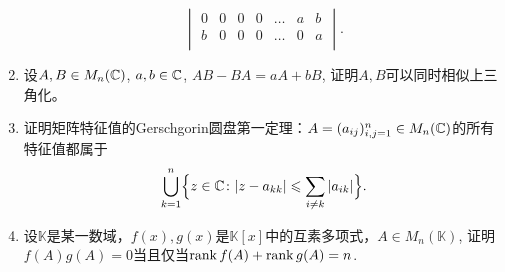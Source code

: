\begin{enumerate}
\begin{equation*}
\begin{vmatrix}
            0 & 0 & 0 & 0 & \dots & a & b \\
            b & 0 & 0 & 0 & \dots & 0 & a \\
        \end{vmatrix}.
    \end{equation*}
    \item 设$A,B\in M_n(\mathbb{C})$, $a,b\in\mathbb{C}$, $AB-BA=aA+bB$, 证明$A, B$可以同时相似上三角化。
    \item 证明矩阵特征值的Gerschgorin圆盘第一定理：$A=(a_{ij})_{i,j=1}^{n}\in M_n(\mathbb{C})$的所有特征值都属于
    \begin{equation*}
        \bigcup_{k=1}^n \Bigl\{ z\in\mathbb{C}\colon |z-a_{kk}|\leqslant \sum_{i\neq k}|a_{ik}|\Bigr\}.
    \end{equation*}
    \item 设$\mathbb{K}$是某一数域，$f(x), g(x)$是$\mathbb{K}[x]$中的互素多项式，$A\in M_n(\mathbb{K})$, 证明$f(A)g(A)=0$当且仅当$\operatorname{rank} f(A)+\operatorname{rank} g(A)=n$.
\end{enumerate}